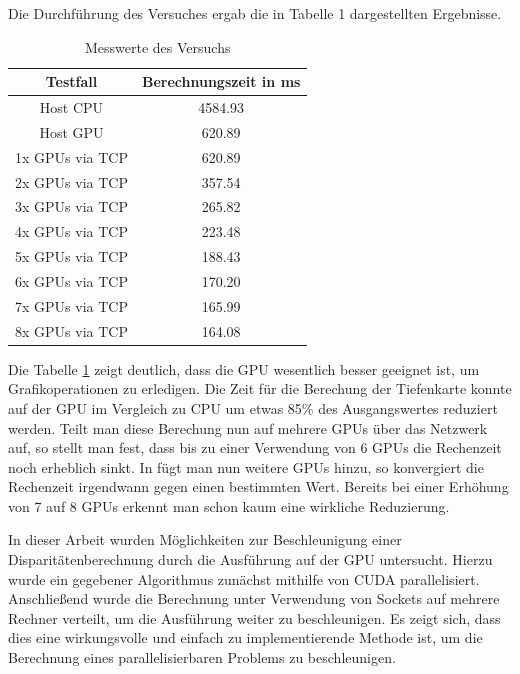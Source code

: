\documentclass[times, 10pt,twocolumn]{article}
\begin{document}
Die Durchführung des Versuches ergab die in Tabelle 1 dargestellten Ergebnisse.
\begin{table}
\begin{tabular}{|c|c|}
\hline
 \textbf{Testfall} & \textbf{Berechnungszeit in ms} \\
\hline
 Host CPU & 4584.93 \\
\hline
 Host GPU & 620.89  \\
\hline
 1x GPUs via TCP & 620.89  \\
\hline
 2x GPUs via TCP & 357.54  \\
 \hline
 3x GPUs via TCP & 265.82  \\
 \hline
 4x GPUs via TCP & 223.48  \\
 \hline
 5x GPUs via TCP & 188.43  \\
 \hline
 6x GPUs via TCP & 170.20  \\
 \hline
 7x GPUs via TCP & 165.99  \\
 \hline
 8x GPUs via TCP & 164.08  \\
 \hline
\end{tabular}
\caption{Messwerte des Versuchs}
\label{tab:messwerte}
\end{table}

Die Tabelle \ref{tab:messwerte} zeigt deutlich, dass die GPU wesentlich besser geeignet ist, um Grafikoperationen zu erledigen. Die Zeit für die Berechung der Tiefenkarte konnte auf der GPU im Vergleich zu CPU um etwas 85\% des Ausgangswertes reduziert werden. Teilt man diese Berechung nun auf mehrere GPUs über das Netzwerk auf, so stellt man fest, dass bis zu einer Verwendung von 6 GPUs die Rechenzeit noch erheblich sinkt. In fügt man nun weitere GPUs hinzu, so konvergiert die Rechenzeit irgendwann gegen einen bestimmten Wert. Bereits bei einer Erhöhung von 7 auf 8 GPUs erkennt man schon kaum eine wirkliche Reduzierung.

In dieser Arbeit wurden Möglichkeiten zur Beschleunigung einer Disparitätenberechnung durch die Ausführung auf der GPU untersucht. Hierzu wurde ein gegebener Algorithmus zunächst mithilfe von CUDA parallelisiert. Anschließend wurde die Berechnung unter Verwendung von Sockets auf mehrere Rechner verteilt, um die Ausführung weiter zu beschleunigen. Es zeigt sich, dass dies eine wirkungsvolle und einfach zu implementierende Methode ist, um die Berechnung eines parallelisierbaren Problems zu beschleunigen.








\end{document}
